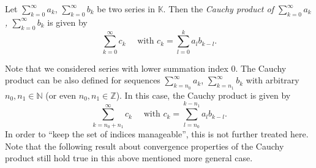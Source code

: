 

\begin{Definition}
Let $\sum_{k=0}^\infty a_k$, $\sum_{k=0}^\infty b_k$ be two series in $\mathbb{K}$. Then the {\em Cauchy product of $\sum_{k=0}^\infty a_k$, $\sum_{k=0}^\infty b_k$} is given by
\[\sum_{k=0}^\infty c_k\quad\text{ with }c_k=\sum_{l=0}^ka_lb_{k-l}.\]
\end{Definition}

\begin{Remark}{}
Note that we considered series with lower summation index 0. The Cauchy product can be also defined for sequences $\sum_{k=n_0}^\infty a_k$, $\sum_{k=n_1}^\infty b_k$ with arbitrary $n_0,n_1\in\mathbb{N}$ (or even $n_0,n_1\in\mathbb{Z}$). In this case, the Cauchy product is given by
\[\sum_{k=n_0+n_1}^\infty c_k\quad\text{ with }c_k=\sum_{l=n_0}^{k-n_1}a_lb_{k-l}.\]
In order to ``keep the set of indices manageable'', this is not further treated here.
Note that the following result about convergence properties of the Cauchy product still hold true in this above mentioned more general case.
\end{Remark}
\whiteskip


